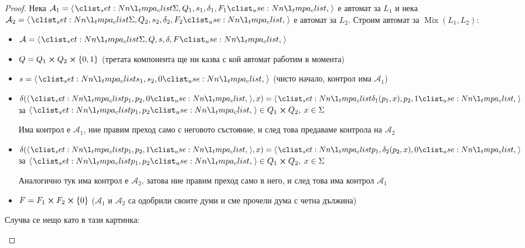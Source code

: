 \begin{proof}
    Нека $\mathcal{A}_1 = \opair{\Sigma, Q_1, s_1, \delta_1, F_1}$ е автомат за $L_1$ и нека $\mathcal{A}_2 = \opair{\Sigma, Q_2, s_2, \delta_2, F_2}$ е автомат за $L_2$.
    Строим автомат за $\operatorname{Mix}(L_1, L_2)$:
    \begin{itemize}
        \item $\mathcal{A} = \opair{\Sigma, Q, s, \delta, F}$
        \item $Q = Q_1 \cross Q_2 \cross \{ 0, 1 \}$ (третата компонента ще ни казва с кой автомат работим в момента)
        \item $s = \opair{s_1, s_2, 0}$ (чисто начало, контрол има $\mathcal{A}_1$)
        \item $\delta(\opair{p_1, p_2, 0}, x) = \opair{\delta_1(p_1, x), p_2, 1}$ за $\opair{p_1, p_2} \in Q_1 \cross Q_2, \: x \in \Sigma$

              Има контрол е $\mathcal{A}_1$, ние правим преход само с неговото състояние, и след това предаваме контрола на $\mathcal{A}_2$
        \item $\delta(\opair{p_1, p_2, 1}, x) = \opair{p_1, \delta_2(p_2, x), 0}$ за $\opair{p_1, p_2} \in Q_1 \cross Q_2, \: x \in \Sigma$

              Аналогично тук има контрол е $\mathcal{A}_2$, затова ние правим преход само в него, и след това има контрол $\mathcal{A}_1$
        \item $F = F_1 \cross F_2 \cross \{ 0 \}$ ($\mathcal{A}_1$ и $\mathcal{A}_2$ са одобрили своите думи и сме прочели дума с четна дължина)
    \end{itemize}

    Случва се нещо като в тази картинка:

    \begin{center}
    \end{center}


\end{proof}
